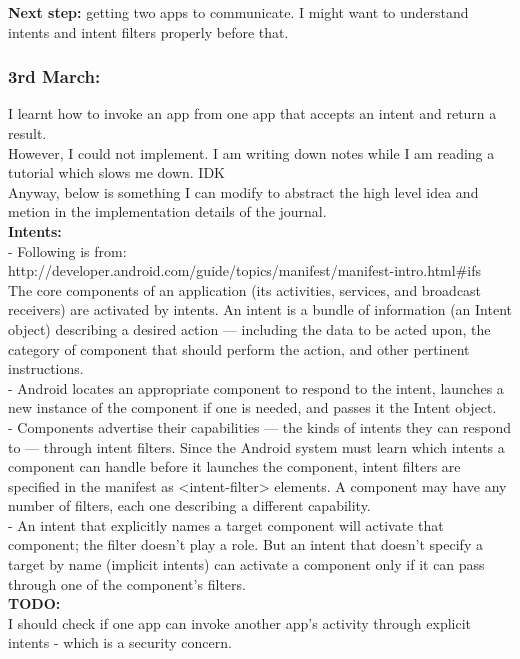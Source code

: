 \documentclass[11pt]{article}
\begin{document}
\textbf{Next step:} getting two apps to communicate. I might want to understand intents and intent filters properly before that.

\subsubsection*{3rd March:}
I learnt how to invoke an app from one app that accepts an intent and return a result.\\
However, I could not implement. I am writing down notes while I am reading a tutorial which slows me down. IDK\\
Anyway, below is something I can modify to abstract the high level idea and metion in the implementation details of the journal.\\

\textbf{Intents:}\\
- Following is from: http://developer.android.com/guide/topics/manifest/manifest-intro.html\#ifs\\
The core components of an application (its activities, services, and broadcast receivers) are activated by intents. An intent is a bundle of 
information (an Intent object) describing a desired action — including the data to be acted upon, the category of component that should perform the 
action, and other pertinent instructions. \\

- Android locates an appropriate component to respond to the intent, launches a new instance of the 
component if one is needed, and passes it the Intent object.\\

- Components advertise their capabilities — the kinds of intents they can respond to — through intent filters. Since the Android system must learn 
which intents a component can handle before it launches the component, intent filters are specified in the manifest as <intent-filter> elements. A 
component may have any number of filters, each one describing a different capability.\\

- An intent that explicitly names a target component will activate that component; the filter doesn't play a role. But an intent that doesn't specify 
a target by name (implicit intents) can activate a component only if it can pass through one of the component's filters.\\

\textbf{TODO:}\\
I should check if one app can invoke another app's activity through explicit intents - which is a security concern.
\end{document}
